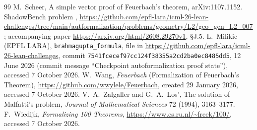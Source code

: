 \documentclass[11pt]{article}
\theoremstyle{definition}
\theoremstyle{remark}
\newcommand{\lean}[1]{\texttt{#1}}
\begin{document}
\begin{thebibliography}{99}
 M.~Scheer, A simple vector proof of Feuerbach's theorem, arXiv:1107.1152.
 ShadowBench problem ,
\url{https://github.com/epfl-lara/icml-26-lean-challenges/tree/main/autformalization/problems/geometry/L2/geo_gen_L2_007};
accompanying paper \url{https://arxiv.org/html/2608.29270v1}, \S J.5.
 L.~Milikic (EPFL LARA), \lean{brahmagupta\_formula}, file
 in
\url{https://github.com/epfl-lara/icml-26-lean-challenges}, commit
\texttt{7541fcecef97cc124f38355a2cd2ba0ec8485dd5}, 12 June 2026 (commit message ``Checkpoint
autoformalization proof state''), accessed 7 October 2026.
 W.~Wang, \emph{Feuerbach} (Formalization of Feuerbach's Theorem),
\url{https://github.com/wwylele/Feuerbach}, created 29 January 2026, accessed 7 October 2026.
 V.~A.~Zalgaller and G.~A.~Los', The solution of Malfatti's problem,
\emph{Journal of Mathematical Sciences} 72 (1994), 3163--3177.
 F.~Wiedijk, \emph{Formalizing 100 Theorems},
\url{https://www.cs.ru.nl/~freek/100/}, accessed 7 October 2026.
\end{thebibliography}
\end{document}
